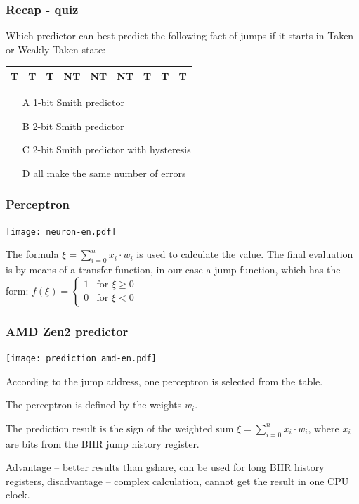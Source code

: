 \documentclass{beamer}
\begin{document}
\begin{frame}
\frametitle{Recap - quiz}

Which predictor can best predict the following fact of jumps if it starts in Taken or Weakly Taken state:

\begin{tabular}{|c|c|c|c|c|c|c|c|c|}\hline
T & T & T & NT & NT & NT& T & T & T \\ \hline
\end{tabular}

\bigskip
\begin{itemize}
 \item[A] 1-bit Smith predictor
 \item[B] 2-bit Smith predictor
 \item[C] 2-bit Smith predictor with hysteresis
 \item[D] all make the same number of errors
\end{itemize}
\end{frame}


\begin{frame}
\frametitle{Perceptron}

\begin{center}
\texttt{[image: neuron-en.pdf]}
\end{center}

The formula $\xi = \sum_{i=0}^{n} x_i \cdot w_i$ is used to calculate the value. The final evaluation is by means of a transfer function, in our case a jump function, which has the form:
$f(\xi) = \begin{cases}1& \text{for }\xi \ge 0\\0& \text{for }\xi <0\end{cases}$
\end{frame}


\begin{frame}
\frametitle{AMD Zen2 predictor}

\begin{center}
\texttt{[image: prediction\_amd-en.pdf]}
\end{center}

According to the jump address, one perceptron is selected from the table.

The perceptron is defined by the weights $w_i$.

The prediction result is the sign of the weighted sum $\xi = \sum_{i=0}^{n} x_i \cdot w_i$, where $x_i$ are bits from the BHR jump history register.

Advantage -- better results than gshare, can be used for long BHR history registers, disadvantage -- complex calculation, cannot get the result in one CPU clock.
\end{frame}
\end{document}
